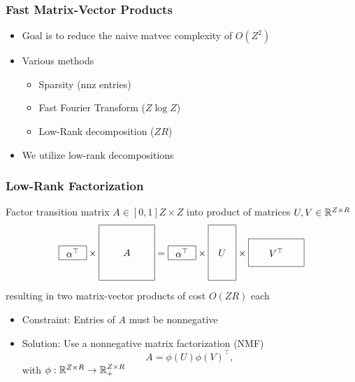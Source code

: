 \documentclass{beamer}
\begin{document}
\begin{frame}
\frametitle{Fast Matrix-Vector Products}
\begin{itemize}
\item Goal is to reduce the naive matvec complexity of $O(Z^2)$
\vspace{2em}
\item Various methods
    \vspace{1em}
    \begin{itemize}
    \item Sparsity (nnz entries)
    \vspace{1em}
    \item Fast Fourier Transform ($Z \log Z$)
    \vspace{1em}
    \item Low-Rank decomposition ($ZR$)
    \end{itemize}
\vspace{2em}
\item We utilize low-rank decompositions
\end{itemize}
\end{frame}

\begin{frame}
\frametitle{Low-Rank Factorization}
Factor transition matrix $A\in[0,1]{Z\times Z}$ into product of matrices $U,V\in\mathbb{R}^{Z \times R}$
\[
\vcenter{\hbox{\begin{tikzpicture}[baseline=-0.5ex]
    \draw (0,0) rectangle (1,.5) node[pos=.5] {$\alpha^\top$};
\end{tikzpicture}}}
\times
\vcenter{\hbox{\begin{tikzpicture}[baseline=-0.5ex]
    \draw (0,0) rectangle (2,2) node[pos=.5] {$A$};
\end{tikzpicture}}}
=
\vcenter{\hbox{\begin{tikzpicture}[baseline=-0.5ex]
    \draw (0,0) rectangle (1,.5) node[pos=.5] {$\alpha^\top$};
\end{tikzpicture}}}
\times
\vcenter{\hbox{\begin{tikzpicture}[baseline=-0.5ex]
    \draw (0,0) rectangle (1,2) node[pos=.5] {$U$};
\end{tikzpicture}}}
\times 
\vcenter{\hbox{\begin{tikzpicture}[baseline=-0.5ex]
    \draw (0,0) rectangle (2,1) node[pos=.5] {$V^\top$};
\end{tikzpicture}}}
\]
resulting in two matrix-vector products of cost $O(ZR)$ each
\vspace{1em}
\begin{itemize}
\item Constraint: Entries of $A$ must be nonnegative
\vspace{1em}
\item Solution: Use a nonnegative matrix factorization (NMF)
$$A = \phi(U)\phi(V)^\top,$$
with $\phi:\mathbb{R}^{Z \times R}\to\mathbb{R}_+^{Z \times R}$
\end{itemize}
\end{frame}
\end{document}
